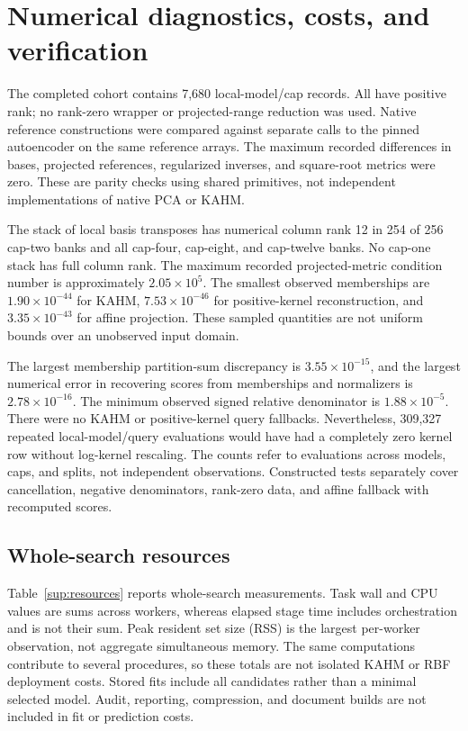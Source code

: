 \section{Numerical diagnostics, costs, and verification}\label{sup:audit}
The completed cohort contains 7,680 local-model/cap records. All have positive rank; no rank-zero wrapper or projected-range reduction was used. Native reference constructions were compared against separate calls to the pinned autoencoder on the same reference arrays. The maximum recorded differences in bases, projected references, regularized inverses, and square-root metrics were zero. These are parity checks using shared primitives, not independent implementations of native PCA or KAHM.

The stack of local basis transposes has numerical column rank 12 in 254 of 256 cap-two banks and all cap-four, cap-eight, and cap-twelve banks. No cap-one stack has full column rank. The maximum recorded projected-metric condition number is approximately $2.05\times10^5$. The smallest observed memberships are $1.90\times10^{-44}$ for KAHM, $7.53\times10^{-46}$ for positive-kernel reconstruction, and $3.35\times10^{-43}$ for affine projection. These sampled quantities are not uniform bounds over an unobserved input domain.

The largest membership partition-sum discrepancy is $3.55\times10^{-15}$, and the largest numerical error in recovering scores from memberships and normalizers is $2.78\times10^{-16}$. The minimum observed signed relative denominator is $1.88\times10^{-5}$. There were no KAHM or positive-kernel query fallbacks. Nevertheless, 309,327 repeated local-model/query evaluations would have had a completely zero kernel row without log-kernel rescaling. The counts refer to evaluations across models, caps, and splits, not independent observations. Constructed tests separately cover cancellation, negative denominators, rank-zero data, and affine fallback with recomputed scores.

\subsection{Whole-search resources}
Table~\ref{sup:resources} reports whole-search measurements. Task wall and CPU values are sums across workers, whereas elapsed stage time includes orchestration and is not their sum. Peak resident set size (RSS) is the largest per-worker observation, not aggregate simultaneous memory. The same computations contribute to several procedures, so these totals are not isolated KAHM or RBF deployment costs. Stored fits include all candidates rather than a minimal selected model. Audit, reporting, compression, and document builds are not included in fit or prediction costs.
\begin{table}[htbp]\centering\small
\caption{Recorded resources for the complete 256-task search. MiB denotes $2^{20}$ bytes.}\label{sup:resources}

\end{table}

